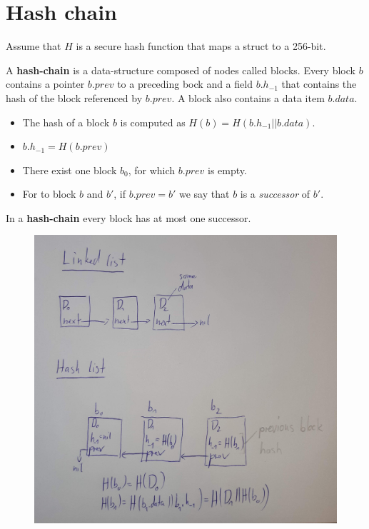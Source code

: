 
\section{Hash chain}

Assume that $H$ is a secure hash function that maps a struct to a 256-bit.

\begin{definition}
A \textbf{hash-chain} is a data-structure composed of nodes called blocks. 
Every block $b$ contains a pointer $b.prev$ to a preceding bock and a field $b.h_{-1}$ 
that contains the hash of the block referenced by $b.prev$.
A block also contains a data item $b.data$.

\begin{itemize}
	\item The hash of a block $b$ is computed as $H(b)= H(b.h_{-1} || b.data)$.
	\item $b.h_{-1}=H(b.prev)$
	\item There exist one block $b_0$, for which $b.prev$ is empty.
	\item For to block $b$ and $b'$, if $b.prev=b'$ we say that $b$ is a \emph{successor} of $b'$.
	
\end{itemize}

In a \textbf{hash-chain} every block has at most one successor.
\end{definition}

\begin{figure}[ht]
	\includegraphics[width=\textwidth]{fig/hash-chain}
	
\end{figure}

